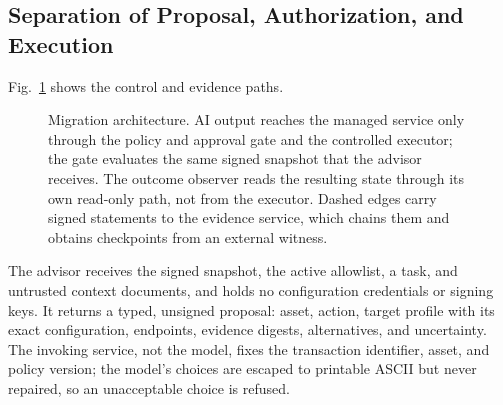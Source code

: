 \documentclass[journal]{IEEEtran}
\begin{document}
\subsection{Separation of Proposal, Authorization, and Execution}
Fig.~\ref{fig:arch} shows the control and evidence paths.
\begin{figure}[t]
\centering
{}
\caption{Migration architecture. AI output reaches the managed service only through the policy and approval gate and the controlled executor; the gate evaluates the same signed snapshot that the advisor receives. The outcome observer reads the resulting state through its own read-only path, not from the executor. Dashed edges carry signed statements to the evidence service, which chains them and obtains checkpoints from an external witness.}
\label{fig:arch}
\end{figure}
The advisor receives the signed snapshot, the active allowlist, a task, and untrusted context documents, and holds no configuration credentials or signing keys. It returns a typed, unsigned proposal: asset, action, target profile with its exact configuration, endpoints, evidence digests, alternatives, and uncertainty. The invoking service, not the model, fixes the transaction identifier, asset, and policy version; the model's choices are escaped to printable ASCII but never repaired, so an unacceptable choice is refused.
\end{document}
